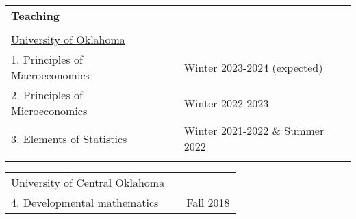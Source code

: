 \documentclass[10pt,letterpaper]{article}
\begin{document}
\begin{tabular}{p{3.25in}p{1.5in}p{6.25in}}


\\
{\textbf{\large{Teaching }}} &\\
\\
\underline{University of Oklahoma }                        &                   & \vspace{0.25 cm}\\
1.  Principles of Macroeconomics             &               & Winter 2023-2024 (expected)\\
2.  Principles of Microeconomics             &               & Winter 2022-2023\\
3. Elements of Statistics             &               & Winter 2021-2022 \& Summer 2022\\
\\
\end{tabular}


\begin{tabular}{p{3.25in}p{1.5in}p{6.25in}}
\underline{University of Central Oklahoma}                       &                    & \vspace{0.25 cm}\\
4.  Developmental mathematics                  &              & Fall 2018 \\

\end{tabular}







\end{document}
